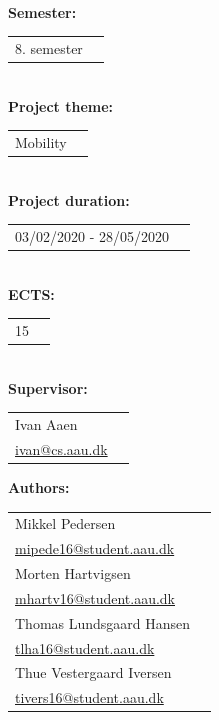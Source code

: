 \newpage
\makeatother
\begin{minipage}[T]{0.45\textwidth}
 \begin{flushleft}
  \textbf{\normalsize{}}\\ \maketitle
  \textbf{\normalsize{Semester:}}\\
  \begin{tabular}{ll}
  \normalsize{8. semester}
  \end{tabular}\\
  \textbf{\normalsize{Project theme:}}\\
  \begin{tabular}{ll}
    \normalsize{Mobility}\\
  \end{tabular}\\
  \textbf{\normalsize{Project duration:}}\\
  \begin{tabular}{ll}
    \normalsize{03/02/2020 - 28/05/2020}
  \end{tabular}\\
  \textbf{\normalsize{ECTS:}}\\
  \begin{tabular}{ll}
  	\normalsize{15}
  \end{tabular}\\
  \textbf{\normalsize{Supervisor:}}\\
  \begin{tabular}{ll}
    \normalsize{Ivan Aaen}\\
    \href{mailto:ivan@cs.aau.dk}{ivan@cs.aau.dk}\\
  \end{tabular}

  \textbf{\normalsize{Authors:}}\\
  \begin{tabular}{ll}
   \normalsize{Mikkel Pedersen}\\
   \href{mailto:mipede16@student.aau.dk}{mipede16@student.aau.dk}\\
   \normalsize{Morten Hartvigsen}\\
   \href{mailto:mhartv16@student.aau.dk}{mhartv16@student.aau.dk}\\
   \normalsize{Thomas Lundsgaard Hansen}\\
   \href{mailto:tlha16@student.aau.dk}{tlha16@student.aau.dk}\\
   \normalsize{Thue Vestergaard Iversen}\\
   \href{mailto:tivers16@student.aau.dk}{tivers16@student.aau.dk}\\
  \end{tabular}
 \end{flushleft}
\end{minipage}

